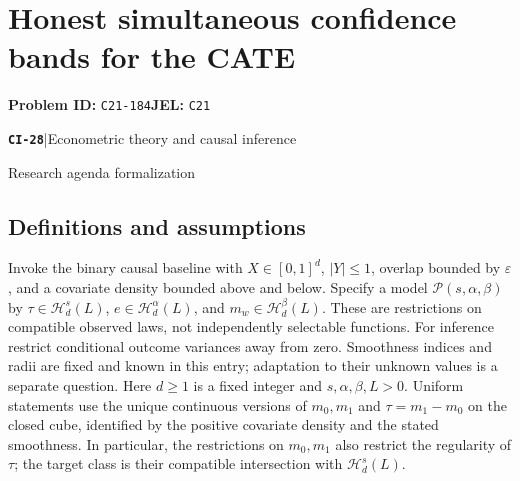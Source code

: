 \documentclass[11pt,a4paper]{article}
\newcommand{\entrymeta}[3]{{\sffamily\small\color{muted}\textbf{\texttt{#1}}\quad|\quad #2\par #3\par}}
\begin{document}
\section*{Honest simultaneous confidence bands for the CATE}
\textbf{Problem ID:} \texttt{C21-184}\quad \textbf{JEL:} \texttt{C21}\par
\label{problem:OP-0507}
\label{beyond:CI-28}
\entrymeta{CI-28}{Econometric theory and causal inference}{Research agenda formalization}
\subsection*{Definitions and assumptions}
Invoke the binary causal baseline with $X\in[0,1]^d$, $|Y|\leq1$, overlap bounded by $\varepsilon$, and a covariate density bounded above and below. Specify a model $\mathcal P(s,\alpha,\beta)$ by $\tau\in\mathcal H_d^s(L)$, $e\in\mathcal H_d^\alpha(L)$, and $m_w\in\mathcal H_d^\beta(L)$. These are restrictions on compatible observed laws, not independently selectable functions. For inference restrict conditional outcome variances away from zero. Smoothness indices and radii are fixed and known in this entry; adaptation to their unknown values is a separate question. Here $d\geq1$ is a fixed integer and $s,\alpha,\beta,L>0$. Uniform statements use the unique continuous versions of $m_0,m_1$ and $\tau=m_1-m_0$ on the closed cube, identified by the positive covariate density and the stated smoothness. In particular, the restrictions on $m_0,m_1$ also restrict the regularity of $\tau$; the target class is their compatible intersection with $\mathcal H_d^s(L)$.
\end{document}

